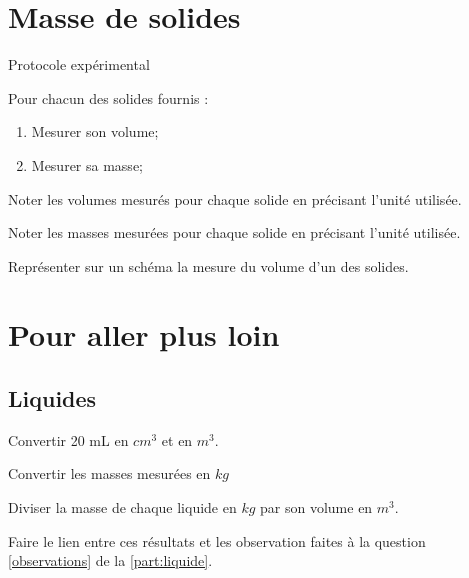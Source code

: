\documentclass[a4paper,11pt]{exam}
\begin{document}
\section{Masse de solides}

\begin{doc}[h!]
	\caption{Protocole expérimental}
	\label{doc:proto2}
	
	Pour chacun des solides fournis :

		
		\begin{enumerate}[label=\arabic*)]
			\item Mesurer son volume;
			\item Mesurer sa masse;
		\end{enumerate}

\end{doc}	


\begin{questions}
	\question Noter les volumes mesurés pour chaque solide en précisant l'unité utilisée.
	\fillwithdottedlines{3cm}
	
	\question Noter les masses mesurées pour chaque solide en précisant l'unité utilisée.
	\fillwithdottedlines{3cm}
	
	\question Représenter sur un schéma la mesure du volume d'un des solides.
	\makeemptybox{8cm}
\end{questions}

\newpage

\section{Pour aller plus loin}

\subsection{Liquides}
	\begin{questions}
		\question Convertir 20 mL en $cm^3$ et en $m^3$.
		
		\fillwithdottedlines{1cm}
		
		\question Convertir les masses mesurées en $kg$
		
		\fillwithdottedlines{2cm}
		
		\question Diviser la masse de chaque liquide en $kg$ par son volume en $m^3$.
		
		\fillwithdottedlines{2cm}
		
		\question Faire le lien entre ces résultats et les observation faites à la question \ref{observations} de la \ref{part:liquide}.
		
		\fillwithdottedlines{3cm}
		
	\end{questions}
\end{document}
